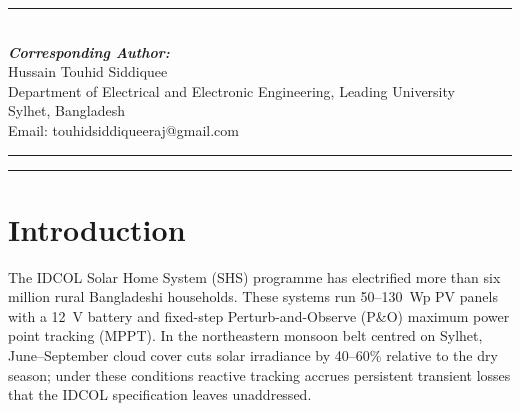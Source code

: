 \documentclass{iaesarticle}
\begin{document}
\parbox[l]{\textwidth}{%
\rule{0.275\textwidth}{0.5pt} \hspace{0.5cm} \hrulefill
\\
\emph{\textbf{Corresponding Author:}}
\vspace{.5em}\\
Hussain Touhid Siddiquee\\
Department of Electrical and Electronic Engineering, Leading University\\
Sylhet, Bangladesh\\
Email: touhidsiddiqueeraj@gmail.com
}
\vspace{.5em}
\hrule
\vspace{.1em}
\hrule

\section{Introduction}

The IDCOL Solar Home System (SHS) programme \cite{ahmed2020} has electrified more than six million rural Bangladeshi households. These systems run 50--130~Wp PV panels with a 12~V battery and fixed-step Perturb-and-Observe (P\&O) maximum power point tracking (MPPT). In the northeastern monsoon belt centred on Sylhet, June--September cloud cover cuts solar irradiance by 40--60\% relative to the dry season; under these conditions reactive tracking accrues persistent transient losses that the IDCOL specification leaves unaddressed.
\end{document}

